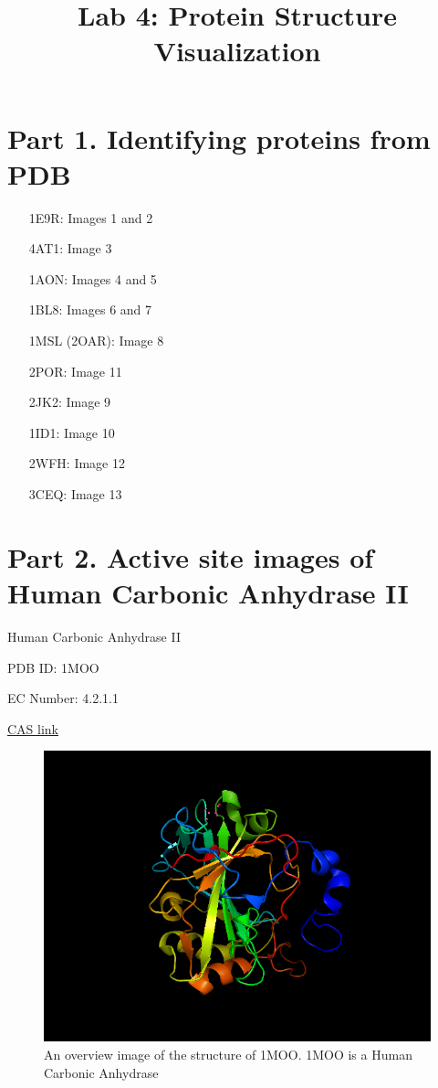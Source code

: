 \documentclass[11pt]{article}
\title{Lab 4: Protein Structure Visualization}
\author{\Name}%
\begin{document}
\maketitle

\section*{Part 1.   Identifying proteins from PDB}

\begin{itemize}
\item[1E9R:] Images 1 and 2
\item[4AT1:] Image 3
\item[1AON:] Images 4 and 5
\item[1BL8:] Images 6 and 7
\item[1MSL (2OAR):] Image 8
\item[2POR:] Image 11
\item[2JK2:] Image 9
\item[1ID1:] Image 10
\item[2WFH:] Image 12
\item[3CEQ:] Image 13
\end{itemize} 

\section*{Part 2. Active site images of Human Carbonic Anhydrase II}

Human Carbonic Anhydrase II

PDB ID: 1MOO

EC Number: 4.2.1.1

\href{http://www.ebi.ac.uk/intenz/query?cmd=SearchID&id=4662}{CAS link}

\begin{figure}

  \centering

\includegraphics[scale=0.5]{1MOO_whole.png}

\caption{An overview image of the structure of 1MOO. 1MOO is a Human Carbonic Anhydrase}
\end{figure}
\end{document}
